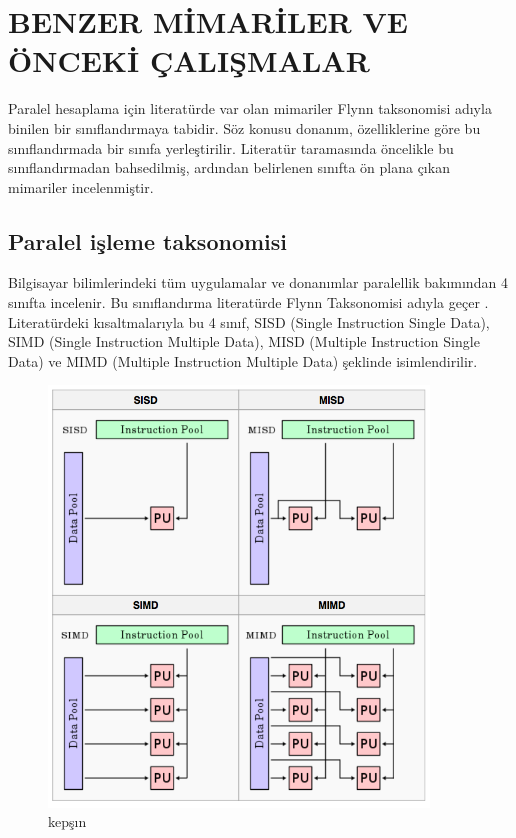 \chapter{BENZER MİMARİLER VE ÖNCEKİ ÇALIŞMALAR}
Paralel hesaplama için literatürde var olan mimariler Flynn taksonomisi adıyla binilen bir sınıflandırmaya tabidir. Söz konusu donanım, özelliklerine göre bu sınıflandırmada bir sınıfa yerleştirilir. Literatür taramasında öncelikle bu sınıflandırmadan bahsedilmiş, ardından belirlenen sınıfta ön plana çıkan mimariler incelenmiştir.

\section{Paralel işleme taksonomisi}
Bilgisayar bilimlerindeki tüm uygulamalar ve donanımlar paralellik bakımından 4 sınıfta incelenir. Bu sınıflandırma literatürde Flynn Taksonomisi adıyla geçer \cite{flynnTaxonomy}. Literatürdeki kısaltmalarıyla bu 4 sınıf, SISD (Single Instruction Single Data), SIMD (Single Instruction Multiple Data), MISD (Multiple Instruction Single Data) ve MIMD (Multiple Instruction Multiple Data) şeklinde isimlendirilir. 

\begin{figure}
\centering
\shorthandoff{=}
\includegraphics[width=0.9\textwidth]{gorsel/flynnTaxonomy.png}
\shorthandoff{=}
\caption{kepşın}
\label{overflow}
\end{figure}


